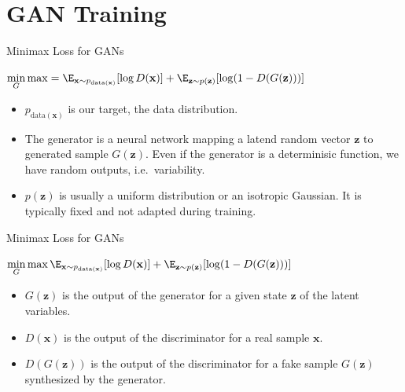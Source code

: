 \section{GAN Training}

\begin{frame} {Minimax Loss for GANs}
  \begin{tcolorbox}
  $\min \limits_G \max  %
  = \E_{\mathbf{x}\sim p_{\text{data}(\mathbf{x})}}[\log D(\mathbf{x})] + \E_{\mathbf{z}\sim p(\mathbf{z})}[\log (1 - D(G(\mathbf{z})))]$
  \end{tcolorbox}
   \begin{itemize}
  \vspace{6mm}
      \item $p_{\text{data}(\mathbf{x})}$ is our target, the data distribution.
  \vspace{6mm}
  \item The generator is a neural network mapping a latend random vector $\mathbf{z}$ to generated sample $G(\mathbf{z})$. Even if the generator is a determinisic function, we have random outputs, i.e.~variability. 
  \vspace{6mm}
      \item $p(\mathbf{z})$ is usually a uniform distribution or an isotropic Gaussian. It is typically fixed and not adapted during training.

   \end{itemize}
\end{frame}

\begin{frame} {Minimax Loss for GANs}
  \begin{tcolorbox}
    $\min \limits_G \max %
    \E_{\mathbf{x}\sim p_{\text{data}(\mathbf{x})}}[\log D(\mathbf{x})] + \E_{\mathbf{z}\sim p(\mathbf{z})}[\log (1 - D(G(\mathbf{z})))]$
  \end{tcolorbox}
  \begin{itemize}
  \vspace{6mm}
    \item $G(\mathbf{z})$ is the output of the generator for a given state $\mathbf{z}$ of the latent variables.
  \vspace{6mm}
      \item $D(\mathbf{x})$ is the output of the discriminator for a real sample $\mathbf{x}$.
  \vspace{6mm}
      \item $D(G(\mathbf{z}))$ is the output of the discriminator for a fake sample $G(\mathbf{z})$ synthesized by the generator.
  \end{itemize}
\end{frame}


